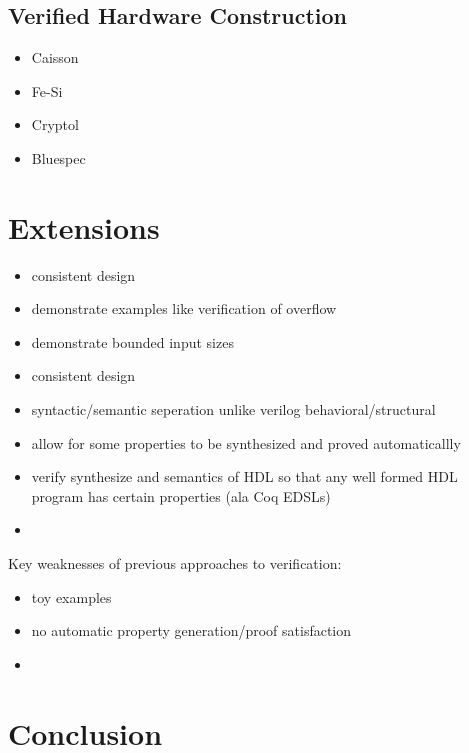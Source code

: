 \documentclass[12pt, titlepage]{article}
\begin{document}
\subsection{Verified Hardware Construction}
\begin{itemize}
    \item Caisson \cite{Li:2011:CHD:1993498.1993512}
    \item Fe-Si \cite{fesi}
    \item Cryptol
    \item Bluespec
\end{itemize}

\section{Extensions}

\begin{itemize}
    \item consistent design
    \item demonstrate examples like verification of overflow
    \item demonstrate bounded input sizes
\end{itemize}

\begin{itemize}
    \item consistent design
    \item syntactic/semantic seperation unlike verilog behavioral/structural
    \item allow for some properties to be synthesized and proved automaticallly
    \item verify synthesize and semantics of HDL so that any well formed HDL program has certain properties (ala Coq EDSLs)
    \item {}
\end{itemize}

Key weaknesses of previous approaches to verification:
\begin{itemize}
    \item toy examples
    \item no automatic property generation/proof satisfaction
    \item 
\end{itemize}


\section{Conclusion}




\end{document}
